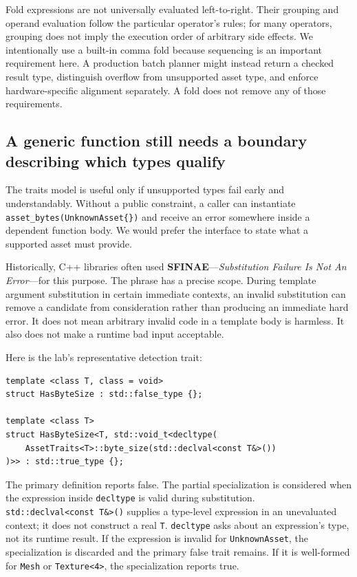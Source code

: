 Fold expressions are not universally evaluated left-to-right. Their grouping and operand evaluation follow the particular operator's rules; for many operators, grouping does not imply the execution order of arbitrary side effects. We intentionally use a built-in comma fold because sequencing is an important requirement here. A production batch planner might instead return a checked result type, distinguish overflow from unsupported asset type, and enforce hardware-specific alignment separately. A fold does not remove any of those requirements.

\subsection{A generic function still needs a boundary describing which types qualify}\label{05-engine-i-ch005-a-generic-function-still-needs-a-boundary-describing-which-types-qualify}

The traits model is useful only if unsupported types fail early and understandably. Without a public constraint, a caller can instantiate \texttt{asset\_bytes(UnknownAsset\{\})} and receive an error somewhere inside a dependent function body. We would prefer the interface to state what a supported asset must provide.

Historically, C++ libraries often used \textbf{SFINAE}---\emph{Substitution Failure Is Not An Error}---for this purpose. The phrase has a precise scope. During template argument substitution in certain immediate contexts, an invalid substitution can remove a candidate from consideration rather than producing an immediate hard error. It does not mean arbitrary invalid code in a template body is harmless. It also does not make a runtime bad input acceptable.

Here is the lab's representative detection trait:

\begin{verbatim}
template <class T, class = void>
struct HasByteSize : std::false_type {};

template <class T>
struct HasByteSize<T, std::void_t<decltype(
    AssetTraits<T>::byte_size(std::declval<const T&>())
)>> : std::true_type {};
\end{verbatim}

The primary definition reports false. The partial specialization is considered when the expression inside \texttt{decltype} is valid during substitution. \texttt{std::declval\textless{}const\ T\&\textgreater{}()} supplies a type-level expression in an unevaluated context; it does not construct a real \texttt{T}. \texttt{decltype} asks about an expression's type, not its runtime result. If the expression is invalid for \texttt{UnknownAsset}, the specialization is discarded and the primary false trait remains. If it is well-formed for \texttt{Mesh} or \texttt{Texture\textless{}4\textgreater{}}, the specialization reports true.

